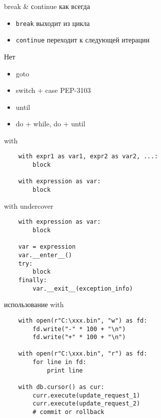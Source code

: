 \documentclass{article}
\begin{document}
\begin{center} break \& сontinue как всегда \end{center}
\begin{itemize}
	\item \lstinline!break!  выходит из цикла
	\item \lstinline!continue! переходит к следующей итерации
\end{itemize}
\newpage

\begin{center} Нет \end{center}
\begin{itemize}
	\item goto 
	\item switch + case PEP-3103
	\item until 
	\item do + while, do + until
\end{itemize}
\newpage

\begin{center} with \end{center}
\vspace{15pt}
\begin{lstlisting}
	with expr1 as var1, expr2 as var2, ...:
		block

	with expression as var:
		block

\end{lstlisting}
\newpage

\begin{center} with undercover \end{center}
\vspace{15pt}
\begin{lstlisting}
	with expression as var:
		block

	var = expression
	var.__enter__()
	try:
		block
	finally:
		var.__exit__(exception_info)
\end{lstlisting}
\newpage

\begin{center} использование with \end{center}
\vspace{15pt}
\begin{lstlisting}
	with open(r"C:\xxx.bin", "w") as fd:
	    fd.write("-" * 100 + "\n")
	    fd.write("+" * 100 + "\n")

	with open(r"C:\xxx.bin", "r") as fd:
	    for line in fd:
	    	print line

	with db.cursor() as cur:
	    curr.execute(update_request_1)
	    curr.execute(update_request_2)
		# commit or rollback
\end{lstlisting}
\newpage
\end{document}
